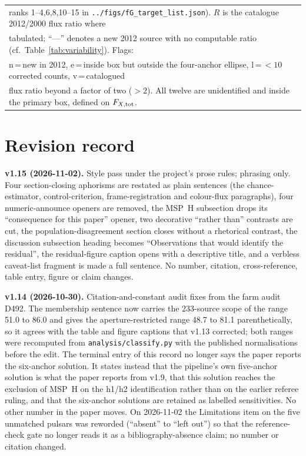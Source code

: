 \documentclass[11pt]{article}
\begin{document}
\begin{table}[htbp]
\begin{tabular}{cllccrrrrrl}
\multicolumn{11}{l}{\footnotesize \phantom{Chart} ranks 1--4,6,8,10--15 in \texttt{../figs/fG\_target\_list.json}). $R$ is the catalogue 2012/2000 flux ratio where} \\
\multicolumn{11}{l}{\footnotesize \phantom{Chart} tabulated; ``---'' denotes a new 2012 source with no computable ratio (cf.\ Table~\ref{tab:variability}). Flags:} \\
\multicolumn{11}{l}{\footnotesize \phantom{Chart} n\,=\,new in 2012, e\,=\,inside box but outside the four-anchor ellipse, l\,=\,$<10$ corrected counts, v\,=\,catalogued} \\
\multicolumn{11}{l}{\footnotesize \phantom{Chart} flux ratio beyond a factor of two ($>2$). All twelve are unidentified and inside the primary box, defined on $F_{X,{\rm tot}}$.} \\
\end{tabular}
\end{table}


\section{Revision record}
\label{app:revisions}

\textbf{v1.15 (2026-11-02).} Style pass under the project's prose rules; phrasing only. Four section-closing aphorisms are restated as plain sentences (the chance-estimator, control-criterion, frame-registration and colour-flux paragraphs), four numeric-announce openers are removed, the MSP~H subsection drops its ``consequence for this paper'' opener, two decorative ``rather than'' contrasts are cut, the population-disagreement section closes without a rhetorical contrast, the discussion subsection heading becomes ``Observations that would identify the residual'', the residual-figure caption opens with a descriptive title, and a verbless caveat-list fragment is made a full sentence. No number, citation, cross-reference, table entry, figure or claim changes.

\textbf{v1.14 (2026-10-30).} Citation-and-constant audit fixes from the farm audit D492. The membership sentence now carries the 233-source scope of the range 51.0 to 86.0 and gives the aperture-restricted range 48.7 to 81.1 parenthetically, so it agrees with the table and figure captions that v1.13 corrected; both ranges were recomputed from \texttt{analysis/classify.py} with the published normalisations before the edit. The terminal entry of this record no longer says the paper reports the six-anchor solution. It states instead that the pipeline's own five-anchor solution is what the paper reports from v1.9, that this solution reaches the exclusion of MSP~H on the h1/h2 identification rather than on the earlier referee ruling, and that the six-anchor solutions are retained as labelled sensitivities. No other number in the paper moves. On 2026-11-02 the Limitations item on the five unmatched pulsars was reworded (``absent'' to ``left out'') so that the reference-check gate no longer reads it as a bibliography-absence claim; no number or citation changed.
\end{document}
